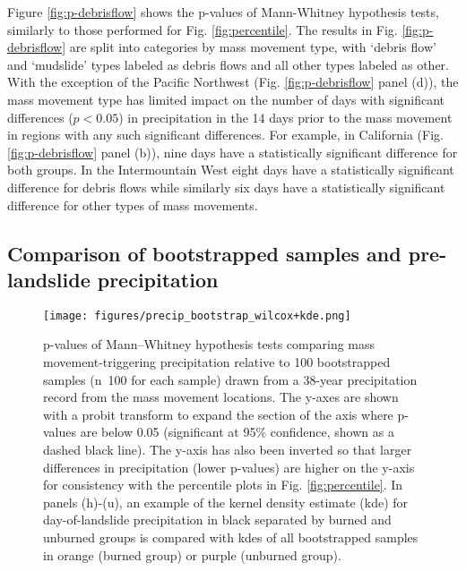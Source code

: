 \documentclass[nhess, manuscript]{copernicus}
\begin{document}
Figure \ref{fig:p-debrisflow} shows the p-values of Mann-Whitney hypothesis tests, similarly to those performed for Fig. \ref{fig:percentile}. The results in Fig. \ref{fig:p-debrisflow} are split into categories by  mass movement type, with ‘debris flow’ and ‘mudslide’ types labeled as debris flows and all other types labeled as other. With the exception of the Pacific Northwest (Fig. \ref{fig:p-debrisflow} panel (d)), the mass movement type has limited impact on the number of days with significant differences ($p < 0.05$) in precipitation in the 14 days prior to the mass movement in regions with any such significant differences. For example, in California (Fig. \ref{fig:p-debrisflow} panel (b)), nine days have a statistically significant difference for both groups. In the Intermountain West eight days have a statistically significant difference for debris flows while similarly six days have a statistically significant difference for other types of mass movements.

\subsection{Comparison of bootstrapped samples and pre-landslide precipitation}
\label{sec:result-bootstrap}

\begin{figure}
\centering
\texttt{[image: figures/precip\_bootstrap\_wilcox+kde.png]}
\caption{p-values of Mann--Whitney hypothesis tests comparing mass movement-triggering  precipitation relative to 100 bootstrapped samples (n~100 for each sample) drawn from a 38-year precipitation record from the mass movement locations. The y-axes are shown with a probit transform to expand the section of the axis where p-values are below 0.05 (significant at 95\% confidence, shown as a dashed black line). The y-axis has also been inverted so that larger differences in precipitation (lower p-values) are higher on the y-axis for consistency with the percentile plots in Fig. \ref{fig:percentile}. In panels (h)-(u), an example of the kernel density estimate (kde) for day-of-landslide precipitation in black separated by burned and unburned groups is compared with kdes of all bootstrapped samples in orange (burned group) or purple (unburned group).}
\label{fig:bootstrap}
\end{figure}
\end{document}
